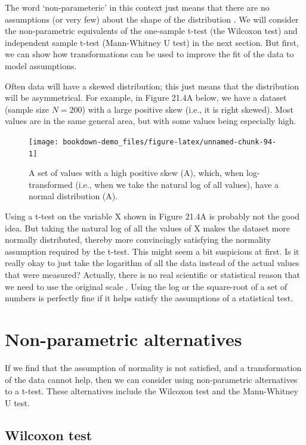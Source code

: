 \documentclass[
]{scrbook}
\begin{document}
The word `non-parameteric' in this context just means that there are no assumptions (or very few) about the shape of the distribution \citep{Dytham2011}.
We will consider the non-parametric equivalents of the one-sample t-test (the Wilcoxon test) and independent sample t-test (Mann-Whitney U test) in the next section.
But first, we can show how transformations can be used to improve the fit of the data to model assumptions.

Often data will have a skewed distribution; this just means that the distribution will be asymmetrical.
For example, in Figure 21.4A below, we have a dataset (sample size \(N = 200\)) with a large positive skew (i.e., it is right skewed).
Most values are in the same general area, but with some values being especially high.

\begin{figure}
\texttt{[image: bookdown-demo\_files/figure-latex/unnamed-chunk-94-1]} \caption{A set of values with a high positive skew (A), which, when log-transformed (i.e., when we take the natural log of all values), have a normal distribution (A).}\label{fig:unnamed-chunk-94}
\end{figure}

Using a t-test on the variable X shown in Figure 21.4A is probably not the good idea.
But taking the natural log of all the values of X makes the dataset more normally distributed, thereby more convincingly satisfying the normality assumption required by the t-test.
This might seem a bit suspicious at first.
Is it really okay to just take the logarithm of all the data instead of the actual values that were measured?
Actually, there is no real scientific or statistical reason that we need to use the original scale \citep{Sokal1995}.
Using the log or the square-root of a set of numbers is perfectly fine if it helps satisfy the assumptions of a statistical test.

\hypertarget{non-parametric-alternatives}{%
\section{Non-parametric alternatives}\label{non-parametric-alternatives}}

If we find that the assumption of normality is not satisfied, and a transformation of the data cannot help, then we can consider using non-parametric alternatives to a t-test.
These alternatives include the Wilcoxon test and the Mann-Whitney U test.

\hypertarget{wilcoxon-test}{%
\subsection{Wilcoxon test}\label{wilcoxon-test}}
\end{document}
